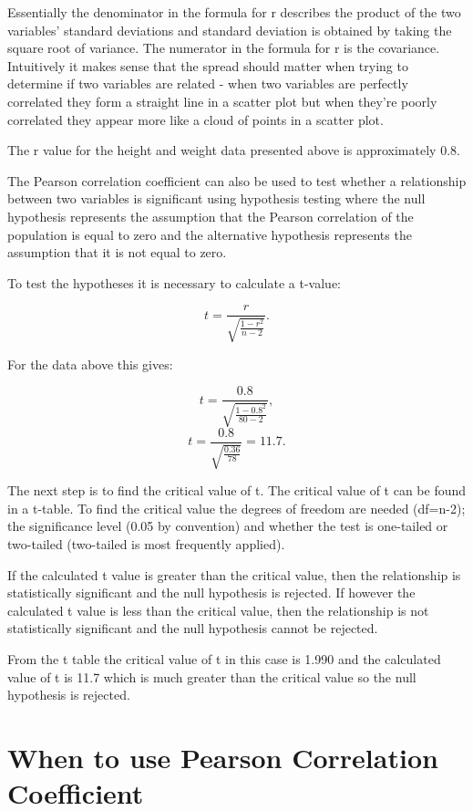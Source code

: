 \documentclass[
]{book}
\begin{document}
Essentially the denominator in the formula for r describes the product of the two variables' standard deviations and standard deviation is obtained by taking the square root of variance. The numerator in the formula for r is the covariance. Intuitively it makes sense that the spread should matter when trying to determine if two variables are related - when two variables are perfectly correlated they form a straight line in a scatter plot but when they're poorly correlated they appear more like a cloud of points in a scatter plot.

The r value for the height and weight data presented above is approximately 0.8.

The Pearson correlation coefficient can also be used to test whether a relationship between two variables is significant using hypothesis testing where the null hypothesis represents the assumption that the Pearson correlation of the population is equal to zero and the alternative hypothesis represents the assumption that it is not equal to zero.

To test the hypotheses it is necessary to calculate a t-value:

\[t=\frac{r}{\sqrt{\frac{1-r^2}{n-2}}}.\]

For the data above this gives:

\[t=\frac{0.8}{\sqrt{\frac{1-0.8^2}{80-2}}},\]
\[t=\frac{0.8}{\sqrt{\frac{0.36}{78}}}= 11.7.\]

The next step is to find the critical value of t. The critical value of t can be found in a t-table. To find the critical value the degrees of freedom are needed (df=n-2); the significance level (0.05 by convention) and whether the test is one-tailed or two-tailed (two-tailed is most frequently applied).

If the calculated t value is greater than the critical value, then the relationship is statistically significant and the null hypothesis is rejected. If however the calculated t value is less than the critical value, then the relationship is not statistically significant and the null hypothesis cannot be rejected.

From the t table the critical value of t in this case is 1.990 and the calculated value of t is 11.7 which is much greater than the critical value so the null hypothesis is rejected.

\hypertarget{when-to-use-pearson-correlation-coefficient}{%
\section{When to use Pearson Correlation Coefficient}\label{when-to-use-pearson-correlation-coefficient}}
\end{document}
